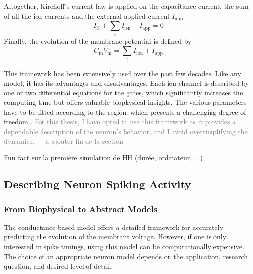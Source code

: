 Altogether,  Kirchoff's current law is applied on the capacitance current, the sum of all the ion currents and the external applied current $I_{\mathrm{app}}$
$$I_C + \sum_i I_{\mathrm{ion}} + I_{\mathrm{app}} = 0$$
Finally, the evolution of the membrane potential is defined by
\begin{equation}
 C_\mathrm{m} \dot{V}_\mathrm{m} = \sum_i I_{\mathrm{ion}} + I_{\mathrm{app}} 
 \label{eq:HH}
 \end{equation}

\begin{minipage}{0.45\textwidth}
This framework has been extensively used over the past few decades. Like any model, it has its advantages and disadvantages. Each ion channel is described by one or two differential equations for the gates, which significantly increases the computing time but offers valuable biophysical insights. The various parameters have to be fitted according to the region, which presents a challenging degree of freedom \citep{prinz_alternative_2003}. 
\textcolor{gray}{For this thesis, I have opted to use this framework as it provides a dependable description of the neuron's behavior, and I avoid oversimplifying the dynamics. --- à ajouter fin de la section}

\end{minipage}
\hfill
\begin{minipage}{0.45\textwidth}
    \begin{lilashaded}
        Fun fact sur la première simulation de HH (durée, ordinateur, ...) 
    \end{lilashaded}
\end{minipage}




\subsection{Describing Neuron Spiking Activity}
\subsubsection{From Biophysical to Abstract Models}
The conductance-based model offers a detailed framework for accurately predicting the evolution of the membrane voltage. However, if one is only interested in spike timings, using this model can be computationally expensive. The choice of an appropriate neuron model depends on the application, research question, and desired level of detail.

